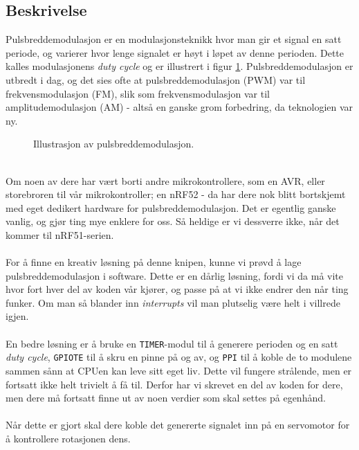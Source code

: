 \documentclass[11pt,a4paper]{article}
\begin{document}
\subsection{Beskrivelse}
Pulsbreddemodulasjon er en modulasjonsteknikk hvor man gir et signal en satt periode, og varierer hvor lenge signalet er høyt i løpet av denne perioden. Dette kalles modulasjonens \textit{duty cycle} og er illustrert i figur \ref{fig::pwm_illustration}. Pulsbreddemodulasjon er utbredt i dag, og det sies ofte at pulsbreddemodulasjon (PWM) var til frekvensmodulasjon (FM), slik som frekvensmodulasjon var til amplitudemodulasjon (AM) - altså en ganske grom forbedring, da teknologien var ny.
\begin{figure}[h]
\centering
{}
\caption{Illustrasjon av pulsbreddemodulasjon.}
\label{fig::pwm_illustration}
\end{figure}\\
Om noen av dere har vært borti andre mikrokontrollere, som en AVR, eller storebroren til vår mikrokontroller; en nRF52 - da har dere nok blitt bortskjemt med eget dedikert hardware for pulsbreddemodulasjon. Det er egentlig ganske vanlig, og gjør ting mye enklere for oss. Så heldige er vi dessverre ikke, når det kommer til nRF51-serien.\\
\\
For å finne en kreativ løsning på denne knipen, kunne vi prøvd å lage pulsbreddemodulasjon i software. Dette er en dårlig løsning, fordi vi da må vite hvor fort hver del av koden vår kjører, og passe på at vi ikke endrer den når ting funker. Om man så blander inn \textit{interrupts} vil man plutselig være helt i villrede igjen.\\
\\
En bedre løsning er å bruke en \texttt{TIMER}-modul til å generere perioden og en satt \textit{duty cycle}, \texttt{GPIOTE} til å skru en pinne på og av, og \texttt{PPI} til å koble de to modulene sammen sånn at CPUen kan leve sitt eget liv. Dette vil fungere strålende, men er fortsatt ikke helt trivielt å få til. Derfor har vi skrevet en del av koden for dere, men dere må fortsatt finne ut av noen verdier som skal settes på egenhånd.\\
\\
Når dette er gjort skal dere koble det genererte signalet inn på en servomotor for å kontrollere rotasjonen dens.
\end{document}
